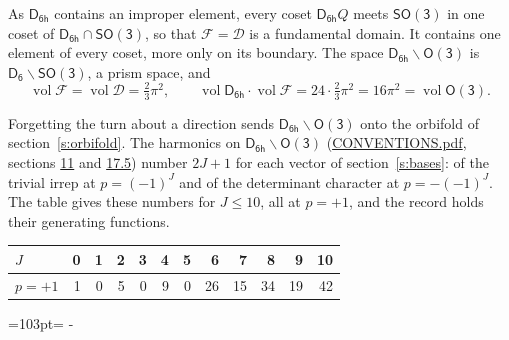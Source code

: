 \documentclass[10pt,a4paper]{article}
\newcommand{\needspace}[1]{\par\penalty-100\begingroup\dimen0=#1\relax\dimen2=\pagegoal
  \advance\dimen2-\pagetotal\ifdim\dimen0>\dimen2\relax\ifdim\dimen2>0pt\vfil\break\fi\fi
  \endgroup}
\numberwithin{equation}{section}
\newcommand{\grp}[1]{\mathsf{#1}}
\newcommand{\vol}{\operatorname{vol}}
\newcommand{\fcell}{\mathcal{D}}
\newcommand{\fdomain}{\mathcal{F}}
\begin{document}
\leavevmode\label{n:set.fundamental}As $\grp{D_{6h}}$ contains an improper element, every coset $\grp{D_{6h}}Q$ meets \href{SO3.pdf}{$\grp{SO(3)}$} in one coset of $\grp{D_{6h}} \cap \grp{SO(3)}$, so that $\fdomain = \fcell$ is a fundamental domain. It contains one element of every coset, more only on its boundary.
The space $\grp{D_{6h}}\backslash\grp{O(3)}$ is $\grp{D_{6}}\backslash\grp{SO(3)}$, a prism space, and
\begin{equation}\label{e:volume}\vol\fdomain = \vol\fcell = \tfrac{2}{3}\pi^2,\qquad \vol\grp{D_{6h}}\cdot\vol\fdomain = 24\cdot \tfrac{2}{3}\pi^2 = 16\pi^2 = \vol\grp{O(3)}.\end{equation}

Forgetting the turn about a direction sends $\grp{D_{6h}}\backslash\grp{O(3)}$ onto the orbifold of section~\ref{s:orbifold}.
The harmonics on $\grp{D_{6h}}\backslash\grp{O(3)}$ (\href{../../CONVENTIONS.pdf}{CONVENTIONS.pdf}, sections \href{../../CONVENTIONS.pdf\#conv.11}{11} and \href{../../CONVENTIONS.pdf\#conv.17.5}{17.5}) number $2J + 1$ for each vector of section~\ref{s:bases}: of the trivial irrep at $p = (-1)^J$ and of the determinant character at $p = -(-1)^J$. The table gives these numbers for $J \le 10$, all at $p = +1$, and the record holds their generating functions.
{\small\setlength{\tabcolsep}{4pt}\begin{longtable}{@{}lrrrrrrrrrrr@{}}\toprule
$J$ & 0 & 1 & 2 & 3 & 4 & 5 & 6 & 7 & 8 & 9 & 10\\\midrule\endhead
\bottomrule\endfoot\endlastfoot
$p = +1$ & 1 & 0 & 5 & 0 & 9 & 0 & 26 & 15 & 34 & 19 & 42\\
\bottomrule\end{longtable}}
\needspace{103pt}
\end{document}
